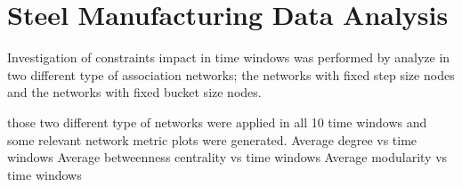 \section{Steel Manufacturing Data Analysis}

{\color{red}

Investigation of constraints impact in time windows was performed by analyze in two different type of association networks; the networks with fixed step size nodes and the networks with fixed bucket size nodes.

those two different type of networks were applied in all 10 time windows and some relevant network metric plots were generated. 
Average degree vs time windows
Average betweenness centrality vs time windows
Average modularity vs time windows
}



